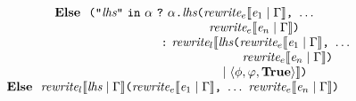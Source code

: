 \[\begin{array}{l}
\spFive\spSeven\spSeven\spSeven \myelse \
\verb+(+\verb+"+\lhs\verb+"+ \ {\tt in}  \ \name \ \verb+?+ \ \name\verb+.+\lhs \verb+(+ \rewriteE\lbr\expr_1\mid\env\rbr \verb+,+ \ \ldots \\
\spFour\spFour\spFive\spEi
 \rewriteE\lbr\expr_n\mid\env\rbr \verb+)+ \\
\spFour\spFour\spOne\spSeven
\verb+:+ \
\rewriteL\lbr\lhs \verb+(+ \rewriteEf{\expr_1}\env\verb+,+ \ \ldots \\
\spFour\spFour\spFour\spSix
 \rewriteEf{\expr_n}\env \verb+)+ \\
\spFour\spFour\spFour\spNine\;
\mid {\argmk\phi\listscope\trueflag}\rbr\verb+)+\\

\spFive \myelse \ \rewriteLf\lhs\env \verb+(+ \rewriteEf{\expr_1}\env \verb+,+ \ \ldots \ \rewriteEf{\expr_n}\env\verb+)+
\end{array}
\]
